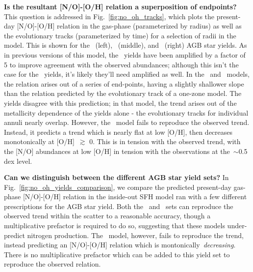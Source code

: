\documentclass[\main/notes.tex]{subfiles}
\begin{document}
\textbf{Is the resultant [N/O]-[O/H] relation a superposition of endpoints?} 
This question is addressed in Fig.~\ref{fig:no_oh_tracks}, which plots the 
present-day [N/O]-[O/H] relation in the gas-phase (parameterized by radius) 
as well as the evolutionary tracks (parameterized by time) for a selection of 
radii in the model. 
This is shown for the~\citet{Cristallo2011} (left),~\citet{Karakas2010} 
(middle), and~\citet{Ventura2013} (right) AGB star yields. 
As in previous versions of this model, the~\citet{Cristallo2011} yields have 
been amplified by a factor of 5 to improve agreement with the observed 
abundances; although this isn't the case for the~\citet{Ventura2013} yields, 
it's likely they'll need amplified as well. 
In the~\citet{Cristallo2011} and~\citet{Ventura2013} models, the relation 
arises out of a series of end-points, having a slightly shallower slope than 
the relation predicted by the evolutionary track of a one-zone model. 
The~\citet{Karakas2010} yields disagree with this prediction; in that model, 
the trend arises out of the metallicity dependence of the yields alone - the 
evolutionary tracks for individual annuli nearly overlap. 
However, the~\citet{Karakas2010} model fails to reproduce the observed trend. 
Instead, it predicts a trend which is nearly flat at low [O/H], then decreases 
monotonically at [O/H]~$\gtrsim$ 0. 
This is in tension with the observed trend, with the [N/O] abundances at low 
[O/H] in tension with the observations at the~$\sim$0.5 dex level. 

\textbf{Can we distinguish between the different AGB star yield sets?} 
In Fig.~\ref{fig:no_oh_yields_comparison}, we compare the predicted present-day 
gas-phase [N/O]-[O/H] relation in the inside-out SFH model ran with a few 
different prescriptions for the AGB star yield. 
Both the~\citet{Cristallo2011, Cristallo2015} and~\citet{Ventura2013} sets can 
reproduce the observed trend within the scatter to a reasonable accuracy, 
though a multiplicative prefactor is required to do so, suggesting that these 
models under-predict nitrogen production. 
The~\citet{Karakas2010} model, however, fails to reproduce the trend, instead 
predicting an [N/O]-[O/H] relation which is montonically~\textit{decreasing}. 
There is no multiplicative prefactor which can be added to this yield set to 
reproduce the observed relation. 
\end{document}
